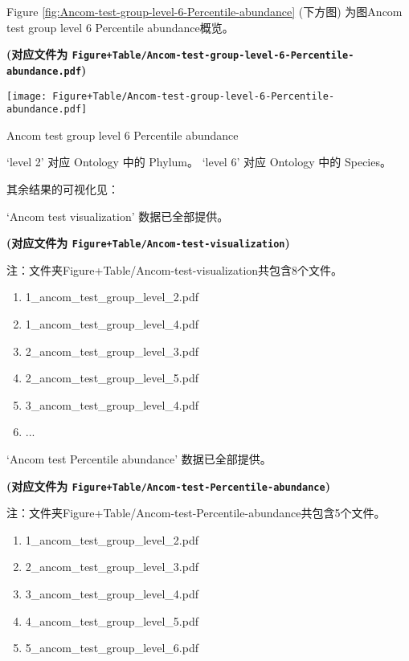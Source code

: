 \documentclass[
]{article}
\providecommand{\tightlist}{%
  \setlength{\itemsep}{0pt}\setlength{\parskip}{0pt}}
\begin{document}
Figure \ref{fig:Ancom-test-group-level-6-Percentile-abundance} (下方图) 为图Ancom test group level 6 Percentile abundance概览。

\textbf{(对应文件为 \texttt{Figure+Table/Ancom-test-group-level-6-Percentile-abundance.pdf})}

\def\@captype{figure}
\begin{center}
\texttt{[image: Figure+Table/Ancom-test-group-level-6-Percentile-abundance.pdf]}
\caption{Ancom test group level 6 Percentile abundance}\label{fig:Ancom-test-group-level-6-Percentile-abundance}
\end{center}

`level 2' 对应 Ontology 中的 Phylum。
`level 6' 对应 Ontology 中的 Species。

其余结果的可视化见：

`Ancom test visualization' 数据已全部提供。

\textbf{(对应文件为 \texttt{Figure+Table/Ancom-test-visualization})}

\begin{center}\begin{tcolorbox}[colback=gray!10, colframe=gray!50, width=0.9\linewidth, arc=1mm, boxrule=0.5pt]注：文件夹Figure+Table/Ancom-test-visualization共包含8个文件。

\begin{enumerate}\tightlist
\item 1\_ancom\_test\_group\_level\_2.pdf
\item 1\_ancom\_test\_group\_level\_4.pdf
\item 2\_ancom\_test\_group\_level\_3.pdf
\item 2\_ancom\_test\_group\_level\_5.pdf
\item 3\_ancom\_test\_group\_level\_4.pdf
\item ...
\end{enumerate}\end{tcolorbox}
\end{center}

`Ancom test Percentile abundance' 数据已全部提供。

\textbf{(对应文件为 \texttt{Figure+Table/Ancom-test-Percentile-abundance})}

\begin{center}\begin{tcolorbox}[colback=gray!10, colframe=gray!50, width=0.9\linewidth, arc=1mm, boxrule=0.5pt]注：文件夹Figure+Table/Ancom-test-Percentile-abundance共包含5个文件。

\begin{enumerate}\tightlist
\item 1\_ancom\_test\_group\_level\_2.pdf
\item 2\_ancom\_test\_group\_level\_3.pdf
\item 3\_ancom\_test\_group\_level\_4.pdf
\item 4\_ancom\_test\_group\_level\_5.pdf
\item 5\_ancom\_test\_group\_level\_6.pdf
\end{enumerate}\end{tcolorbox}
\end{center}
\end{document}
